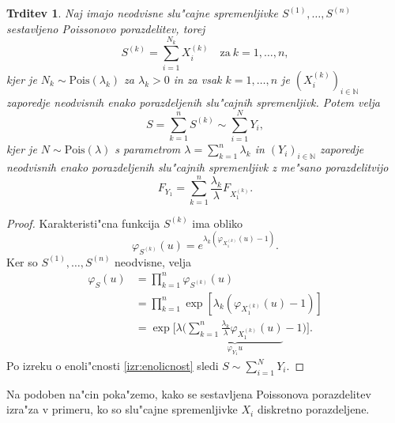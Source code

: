 \documentclass[12pt, a4paper, reqno]{amsart}
\theoremstyle{definition}
\theoremstyle{plain}
\newtheorem{trditev}[definicija]{Trditev}
\newcommand{\N}{\mathbb{N}}
\newcommand{\1}{\mathds{1}}
\newcommand{\Pois}[1]{\text{Pois}(#1)}
\newcommand*{\refPriloga}[1]{%
  \begingroup
    \hypersetup{
      linkcolor=properpurple,
      linkbordercolor=properpurple,
    }%
    \ref{#1}%
  \endgroup
}
\begin{document}
    \begin{trditev}
        Naj imajo neodvisne slu"cajne spremenljivke $S^{(1)}, \dots, S^{(n)}$ sestavljeno Poissonovo porazdelitev, torej 
        \begin{equation*}
            S^{(k)} = \sum_{i=1}^{N_k}X_i^{(k)} \quad \text{za} \ k=1, \dots, n,
        \end{equation*}
        kjer je $N_k\sim \Pois{\lambda_k}$ za $\lambda_k > 0$ in za vsak $k = 1, \dots, n$ je $(X_i^{(k)})_{i\in\N}$ 
        zaporedje neodvisnih enako porazdeljenih slu"cajnih spremenljivk. Potem velja   
        \begin{equation*}
            S = \sum_{k=1}^nS^{(k)} \sim \sum_{i=1}^{N}Y_i,
        \end{equation*}
        kjer je $N\sim\Pois{\lambda}$ s parametrom $\lambda = \sum_{k=1}^n\lambda_k$ in $(Y_i)_{i\in\N}$ zaporedje
        neodvisnih enako porazdeljenih slu"cajnih spremenljivk z me"sano porazdelitvijo
        \begin{equation*}
        F_{Y_1} = \sum_{k=1}^n\frac{\lambda_k}{\lambda}F_{X_1^{(k)}}.
        \end{equation*}
        \label{trd:vsotaCPDjeCPD}
    \end{trditev}

    \begin{proof}
        Karakteristi"cna funkcija $S^{(k)}$ ima obliko
        \begin{equation*}
            \varphi_{S^{(k)}}(u) = e^{\lambda_k\left(\varphi_{X_1^{(k)}}(u) - 1\right)}.
        \end{equation*}
        Ker so $S^{(1)}, \dots, S^{(n)}$ neodvisne, velja
        \begin{align*}
            \varphi_{S}(u) 
                &= \prod_{k=1}^n\varphi_{S^{(k)}}(u) \\
                &= \prod_{k=1}^n\exp\left[\lambda_k\left(\varphi_{X_1^{(k)}}(u) - 1\right)\right] \\
                &= \exp\Biggl[\lambda\Biggl(\underbrace{\sum_{k=1}^n \frac{\lambda_k}{\lambda} \varphi_{X_1^{(k)}}(u)}_{\varphi_{Y_1}{u}} - 1\Biggr)\Biggr].
        \end{align*}
        Po izreku o 
        enoli"cnosti \refPriloga{izr:enolicnost} sledi $S\sim\sum_{i=1}^{N}Y_i$.
    \end{proof}

    Na podoben na"cin poka"zemo, kako se sestavljena Poissonova porazdelitev izra"za v primeru, ko so
    slu"cajne spremenljivke $X_i$ diskretno porazdeljene.
\end{document}
